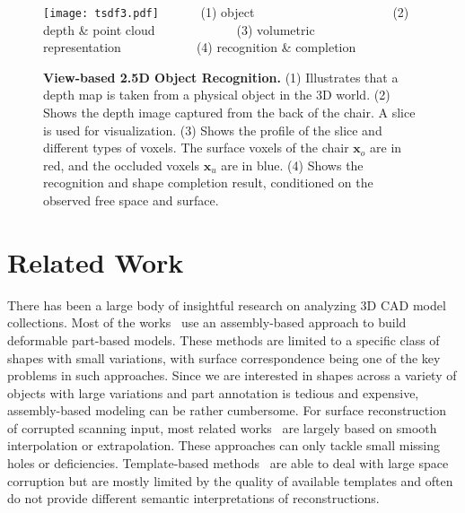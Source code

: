 \documentclass[10pt,twocolumn,letterpaper]{article}
\begin{document}
\begin{figure*}[t]
\centering
\texttt{[image: tsdf3.pdf]}
~~~~~~(1) object~~~~~~~~~~~~~~~~~~~~~~(2) depth \& point cloud~~~~~~~~~~~~~(3) volumetric representation~~~~~~~~~~~~(4) recognition \& completion 

\vspace{-1mm}
\caption{
{\bf View-based 2.5D Object Recognition.}
(1) Illustrates that a depth map is taken from a physical object in the 3D world. 
(2) Shows the depth image captured from the back of the chair. A slice is used for visualization. 
(3) Shows the profile of the slice and different types of voxels.
The surface voxels of the chair $\mathbf{x}_o$ are in red, and the occluded voxels $\mathbf{x}_u$ are in blue.
(4) Shows the recognition and shape completion result, conditioned on the observed free space and surface.}
\label{fig:25Drecognition}
\vspace{-3mm}
\end{figure*}

\section{Related Work}
There has been a large body of insightful research on analyzing 3D CAD model collections. Most of the works~\cite{Sid2011,TomAssembly,Sid2012} use an assembly-based approach to build deformable part-based models. These methods are limited to a specific class of shapes with small variations, with surface correspondence being one of the key problems in such approaches. Since we are interested in shapes across a variety of objects with large variations and part annotation is tedious and expensive, assembly-based modeling can be rather cumbersome.
For surface reconstruction of corrupted scanning input, most related works~\cite{recon2,recon1} are largely based on smooth interpolation or extrapolation. These approaches can only tackle small missing holes or deficiencies. Template-based methods~\cite{Shen2012} are able to deal with large space corruption but are mostly limited by the quality of available templates and often do not provide different semantic interpretations of reconstructions.
\end{document}
